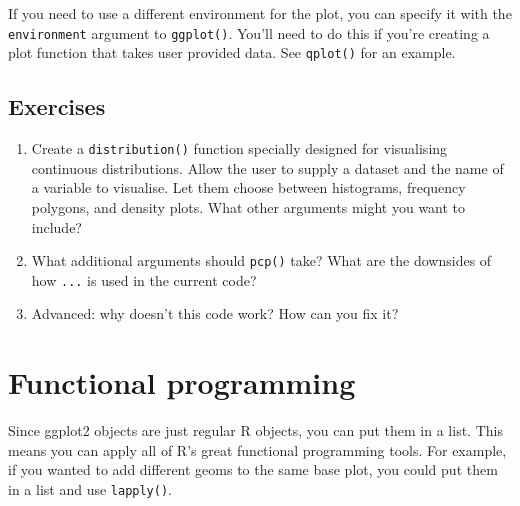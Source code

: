 If you need to use a different environment for the plot, you can specify
it with the \texttt{environment} argument to \texttt{ggplot()}. You'll
need to do this if you're creating a plot function that takes user
provided data. See \texttt{qplot()} for an example.

\subsection{Exercises}

\begin{enumerate}
\def\labelenumi{\arabic{enumi}.}
\item
  Create a \texttt{distribution()} function specially designed for
  visualising continuous distributions. Allow the user to supply a
  dataset and the name of a variable to visualise. Let them choose
  between histograms, frequency polygons, and density plots. What other
  arguments might you want to include?
\item
  What additional arguments should \texttt{pcp()} take? What are the
  downsides of how \texttt{...} is used in the current code?
\item
  Advanced: why doesn't this code work? How can you fix it?

\begin{Shaded}
\begin{Highlighting}[]
\StringTok{ }
  \StringTok{ }\NormalTok{(}\NormalTok{, }\NormalTok{, }\NormalTok{, }\NormalTok{, }\NormalTok{, }
    \NormalTok{, }\NormalTok{)}
   
\NormalTok{\}}
\NormalTok{()}
\end{Highlighting}
\end{Shaded}
\end{enumerate}

\section{Functional programming}

Since ggplot2 objects are just regular R objects, you can put them in a
list. This means you can apply all of R's great functional programming
tools. For example, if you wanted to add different geoms to the same
base plot, you could put them in a list and use \texttt{lapply()}.
 

